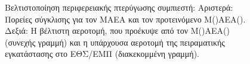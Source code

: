 \begin{figure}[h!]
\begin{minipage}[b]{0.5\linewidth}
 \centering
\end{minipage}
\begin{minipage}[b]{0.5\linewidth}
 \centering
\end{minipage}
\caption{Βελτιστοποίηση περιφερειακής πτερύγωσης συμπιεστή: Αριστερά: Πορείες σύγκλισης για τον ΜΑΕΑ και τον προτεινόμενο Μ()ΑΕΑ(). Δεξιά: Η βέλτιστη αεροτομή, που προέκυψε από τον Μ()ΑΕΑ() (συνεχής γραμμή) και η υπάρχουσα αεροτομή της πειραματικής εγκατάστασης στο ΕΘΣ/ΕΜΠ (διακεκομμένη γραμμή).} 
\label{PCAcomp}
\end{figure}

